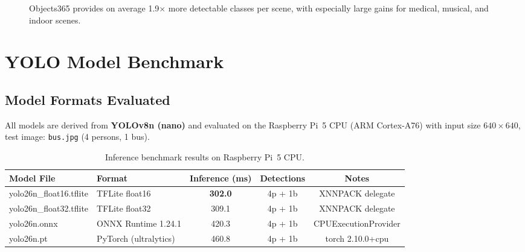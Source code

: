 \documentclass[12pt,a4paper]{article}
\begin{document}
\begin{figure}[H]
\centering
{}
\caption{Objects365 provides on average 1.9$\times$ more detectable classes per
scene, with especially large gains for medical, musical, and indoor scenes.}
\label{fig:vocab_bar}
\end{figure}

\section{YOLO Model Benchmark}

\subsection{Model Formats Evaluated}

All models are derived from \textbf{YOLOv8n (nano)} and evaluated on the
Raspberry Pi~5 CPU (ARM Cortex-A76) with input size $640 \times 640$, test
image: \texttt{bus.jpg} (4 persons, 1 bus).

\begin{table}[H]
\centering
\caption{Inference benchmark results on Raspberry Pi~5 CPU.}
\label{tab:benchmark}
\begin{tabular}{@{}llccc@{}}
\toprule
\textbf{Model File}    & \textbf{Format}      & \textbf{Inference (ms)} & \textbf{Detections} & \textbf{Notes} \\
\midrule
yolo26n\_float16.tflite & TFLite float16      & \textbf{302.0}          & 4p + 1b & XNNPACK delegate \\
yolo26n\_float32.tflite & TFLite float32      & 309.1                   & 4p + 1b & XNNPACK delegate \\
yolo26n.onnx            & ONNX Runtime 1.24.1 & 420.3                   & 4p + 1b & CPUExecutionProvider \\
yolo26n.pt              & PyTorch (ultralytics)& 460.8                  & 4p + 1b & torch 2.10.0+cpu \\
\bottomrule
\end{tabular}
\end{table}
\end{document}
